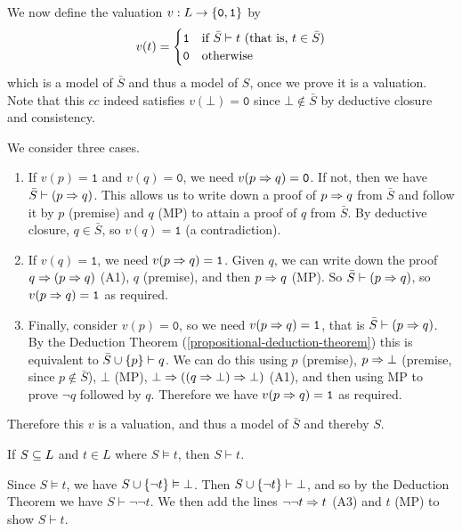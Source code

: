 \documentclass{article}
\begin{document}
\begin{prf}
	We now define the valuation $v: L \to \left\lbrace \texttt{0}, \texttt{1} \right\rbrace$ by 
	\[
	v(t) = \begin{cases}
		\texttt{1} & \text{if $\bar S \vdash t$ (that is, $t \in \bar S$)} \\
		\texttt{0} & \!\mathrel{\, \text{otherwise}}
	\end{cases}
	\]
	which is a model of $\bar S$ and thus a model of $S$, once we prove it is a valuation. Note that this $cc$ indeed satisfies $v(\bot) = \texttt{0}$ since $\bot \notin \bar S$ by deductive closure and consistency.
	
	We consider three cases.
	\begin{enumerate}
    	\item If $v(p) = \texttt{1}$ and $v(q) = \texttt{0}$, we need $v(p \Rightarrow q) = \texttt{0}$. If not, then we have $\bar S \vdash (p \Rightarrow q)$. This allows us to write down a proof of $p \Rightarrow q$ from $\bar S$ and follow it by $p$ (premise) and $q$ (MP) to attain a proof of $q$ from $\bar S$. By deductive closure, $q \in \bar S$, so $v(q) = \texttt{1}$ (a contradiction).
    	\item If $v(q) = \texttt{1}$, we need $v(p \Rightarrow q) = \texttt{1}$. Given $q$, we can write down the proof $q \Rightarrow (p \Rightarrow q)$ (A1), $q$ (premise), and then $p \Rightarrow q$ (MP). So $\bar S \vdash (p \Rightarrow q)$, so $v(p \Rightarrow q) = \texttt{1}$ as required.
    	\item Finally, consider $v(p) = \texttt{0}$, so we need $v(p \Rightarrow q) = \texttt{1}$, that is $\bar S \vdash (p \Rightarrow q)$. By the Deduction Theorem (\ref{propositional-deduction-theorem}) this is equivalent to $\bar S \cup \left\lbrace p \right\rbrace \vdash q$. We can do this using $p$ (premise), $p \Rightarrow \bot$ (premise, since $p \notin \bar S$), $\bot$ (MP), $\bot \Rightarrow ((q \Rightarrow \bot) \Rightarrow \bot)$ (A1), and then using MP to prove $\lnot q$ followed by $q$. Therefore we have $v(p \Rightarrow q) = \texttt{1}$ as required.
	\end{enumerate}
	Therefore this $v$ is a valuation, and thus a model of $\bar S$ and thereby $S$.
\end{prf}

\begin{theorem}
	\label{propositional-adequacy-theorem}
	If $S \subseteq L$ and $t \in L$ where $S \vDash t$, then $S \vdash t$.
\end{theorem}

\begin{prf}
    Since $S \vDash t$, we have $S \cup \left\lbrace \lnot t \right\rbrace \vDash \bot$. Then $S \cup \left\lbrace \lnot t \right\rbrace \vdash \bot$, and so by the Deduction Theorem we have $S \vdash \lnot \lnot t$. We then add the lines $\lnot \lnot t \Rightarrow t$ (A3) and $t$ (MP) to show $S \vdash t$.
\end{prf}
\end{document}
